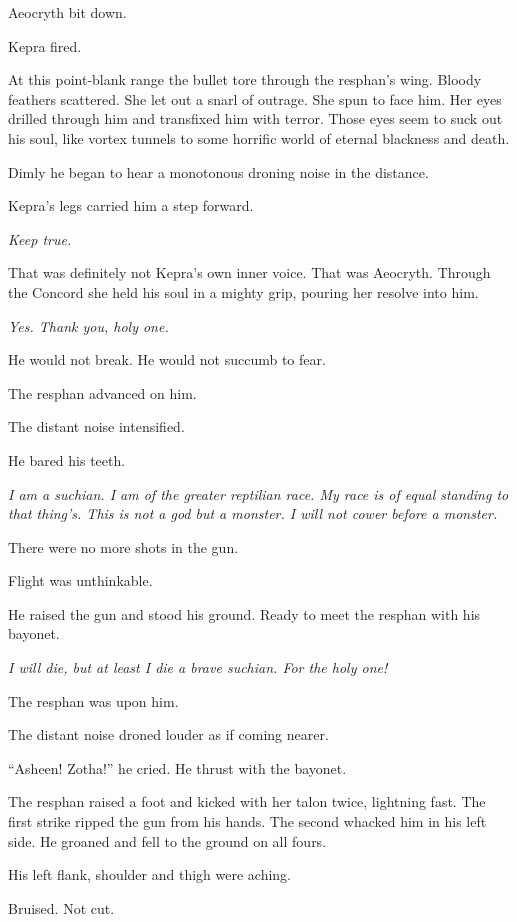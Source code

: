 \documentclass
  [a4paper,
   12pt,
   oneside
  ]%
  {article}
\begin{document}
Aeocryth bit down.

Kepra fired. 

At this point-blank range the bullet tore through the resphan’s wing. 
Bloody feathers scattered. 
She let out a snarl of outrage. 
She spun to face him. 
Her eyes drilled through him and transfixed him with terror. 
Those eyes seem to suck out his soul, like vortex tunnels to some horrific world of eternal blackness and death. 

Dimly he began to hear a monotonous droning noise in the distance.

Kepra's legs carried him a step forward. 

\emph{Keep true.} 

That was definitely not Kepra's own inner voice. 
That was Aeocryth. 
Through the Concord she held his soul in a mighty grip, pouring her resolve into him.

\emph{Yes. Thank you, holy one.}

He would not break.
He would not succumb to fear.

The resphan advanced on him. 

The distant noise intensified.

He bared his teeth.

\emph{%
    I am a suchian. I am of the greater reptilian race. My race is of equal standing to that thing's. This is not a god but a monster. I will not cower before a monster.}

There were no more shots in the gun. 

Flight was unthinkable.

He raised the gun and stood his ground. Ready to meet the resphan with his bayonet. 

\emph{I will die, but at least I die a brave suchian. For the holy one!} 

The resphan was upon him.

The distant noise droned louder as if coming nearer.

``Asheen! Zotha!'' he cried. He thrust with the bayonet.

The resphan raised a foot and kicked with her talon twice, lightning fast. 
The first strike ripped the gun from his hands. 
The second whacked him in his left side. He groaned and fell to the ground on all fours. 

His left flank, shoulder and thigh were aching. 

Bruised. Not cut. 
\end{document}
